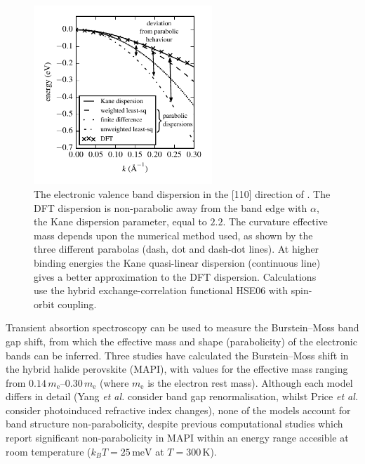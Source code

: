 \begin{figure}[tb] \centering
\includegraphics[width=0.6\textwidth]{./figures/ch4/fits_to_dispersion.pdf}
\caption[Plot of three numerical methods used to fit a DFT calculated dispersion]{\label{dispersion_fits} The electronic valence band dispersion in the [110] direction of . The DFT dispersion is non-parabolic away from the band edge with $\alpha$, the Kane dispersion parameter, equal to ${2.2}$. The curvature effective mass depends upon the numerical method used, as shown by the three different parabolas (dash, dot and dash-dot lines). At higher binding energies the Kane quasi-linear dispersion (continuous line) gives a better approximation to the DFT dispersion. Calculations use the hybrid exchange-correlation functional HSE06 with spin-orbit coupling.}
\end{figure}

Transient absortion spectroscopy can be used to measure the Burstein--Moss band gap shift, from which the effective mass and shape (parabolicity) of the electronic bands can be inferred.
Three studies have calculated the Burstein--Moss shift in the hybrid halide perovskite  (MAPI), with values for the effective mass ranging from $0.14\,m_{\text{e}}$--$0.30\,m_{\text{e}}$ (where $m_{\text{e}}$ is the electron rest mass).\autocite{Manser2014,Yang2015,Price2015}
Although each model differs in detail (Yang \textit{et al.} consider band gap renormalisation,\autocite{Yang2015} whilst Price \textit{et al.} consider photoinduced refractive index changes\autocite{Price2015}), none of the models account for band structure non-parabolicity, despite previous computational studies which report significant non-parabolicity in MAPI within an energy range accesible at room temperature ($k_BT=25\,\mathrm{meV}$ at $T=300\,\mathrm{K}$). 

